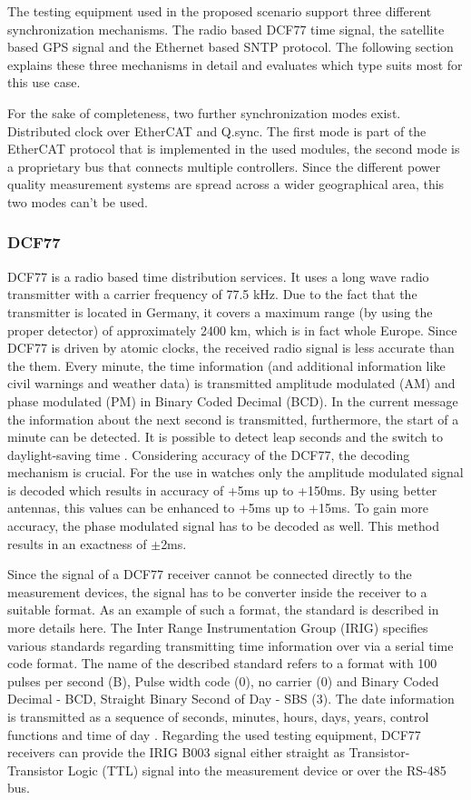 The testing equipment used in the proposed scenario support three different synchronization mechanisms. The radio based DCF77 time signal, the satellite based GPS signal and the Ethernet based SNTP protocol. The following section explains these three mechanisms in detail and evaluates which type suits most for this use case.

For the sake of completeness, two further synchronization modes exist. Distributed clock over EtherCAT and Q.sync. The first mode is part of the EtherCAT protocol that is implemented in the used modules, the second mode is a proprietary bus that connects multiple controllers. Since the different power quality measurement systems are spread across a wider geographical area, this two modes can't be used.

\subsubsection{DCF77}
DCF77 is a radio based time distribution services. It uses a long wave radio transmitter with a carrier frequency of 77.5 kHz. Due to the fact that the transmitter is located in Germany, it covers a maximum range (by using the proper detector) of approximately 2400 km, which is in fact whole Europe. Since DCF77 is driven by atomic clocks, the received radio signal is less accurate than the them\cite{dcf77}. Every minute, the time information (and additional information like civil warnings\cite{dcf77_2} and weather data\cite{dcf77}) is transmitted amplitude modulated (AM) and phase modulated (PM) in Binary Coded Decimal (BCD). In the current message the information about the next second is transmitted, furthermore, the start of a minute can be detected. It is possible to detect leap seconds and the switch to daylight-saving time \cite{dcf77_2}. Considering accuracy of the DCF77, the decoding mechanism is crucial. For the use in watches only the amplitude modulated signal is decoded which results in accuracy of +5ms up to +150ms. By using better antennas, this values can be enhanced to +5ms up to +15ms. To gain more accuracy, the phase modulated signal has to be decoded as well. This method results in an exactness of $\pm$2ms\cite{dcf77_3}.

Since the signal of a DCF77 receiver cannot be connected directly to the measurement devices, the signal has to be converter inside the receiver to a suitable format. As an example of such a format, the  standard is described in more details here. The Inter Range Instrumentation Group (IRIG) specifies various standards regarding transmitting time information over via a serial time code format. The name of the described standard refers to a format with 100 pulses per second (B), Pulse width code (0), no carrier (0) and Binary Coded Decimal - BCD, Straight Binary Second of Day - SBS (3). The date information is transmitted as a sequence of seconds, minutes, hours, days, years, control functions and time of day \cite{irig}. Regarding the used testing equipment, DCF77 receivers can provide the IRIG B003 signal either straight as Transistor-Transistor Logic (TTL) signal into the measurement device or over the RS-485 bus.

